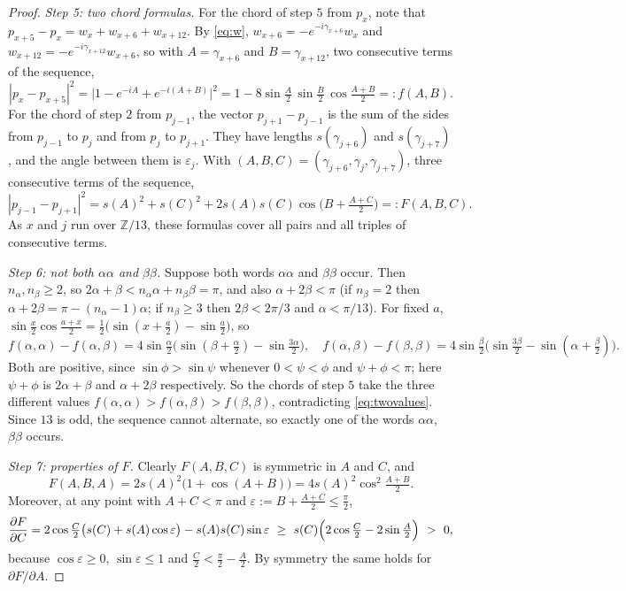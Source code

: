 \documentclass[11pt]{amsart}
\theoremstyle{definition}
\theoremstyle{remark}
\newcommand{\Z}{\mathbb{Z}}
\begin{document}
\begin{proof}
\emph{Step 5: two chord formulas.} For the chord of step $5$ from $p_x$, note that
$p_{x+5}-p_x=w_x+w_{x+6}+w_{x+12}$. By \eqref{eq:w}, $w_{x+6}=-e^{-i\gamma_{x+6}}w_x$ and
$w_{x+12}=-e^{-i\gamma_{x+12}}w_{x+6}$, so with $A=\gamma_{x+6}$ and $B=\gamma_{x+12}$, two consecutive terms
of the sequence,
\[
  |p_x-p_{x+5}|^2=\bigl|1-e^{-iA}+e^{-i(A+B)}\bigr|^2
  =1-8\sin\tfrac A2\,\sin\tfrac B2\,\cos\tfrac{A+B}2=:f(A,B).
\]
For the chord of step $2$ from $p_{j-1}$, the vector $p_{j+1}-p_{j-1}$ is the sum of the
sides from $p_{j-1}$ to $p_j$ and from $p_j$ to $p_{j+1}$. They have lengths $s(\gamma_{j+6})$ and
$s(\gamma_{j+7})$, and the angle between them is $\varepsilon_j$. With $(A,B,C)=(\gamma_{j+6},\gamma_j,\gamma_{j+7})$, three consecutive terms of the
sequence,
\[
  |p_{j-1}-p_{j+1}|^2=s(A)^2+s(C)^2+2s(A)s(C)\cos\bigl(B+\tfrac{A+C}2\bigr)=:F(A,B,C).
\]
As $x$ and $j$ run over $\Z/13$, these formulas cover all pairs and all triples of consecutive terms.

\emph{Step 6: not both $\alpha\alpha$ and $\beta\beta$.} Suppose both words $\alpha\alpha$ and $\beta\beta$
occur. Then $n_\alpha,n_\beta\ge2$, so $2\alpha+\beta<n_\alpha\alpha+n_\beta\beta=\pi$, and also
$\alpha+2\beta<\pi$ (if $n_\beta=2$ then $\alpha+2\beta=\pi-(n_\alpha-1)\alpha$; if $n_\beta\ge3$ then
$2\beta<2\pi/3$ and $\alpha<\pi/13$). For fixed $a$,
$\sin\frac x2\cos\frac{a+x}2=\frac12\bigl(\sin(x+\frac a2)-\sin\frac a2\bigr)$, so
\[
  f(\alpha,\alpha)-f(\alpha,\beta)=4\sin\tfrac\alpha2\bigl(\sin(\beta+\tfrac\alpha2)-\sin\tfrac{3\alpha}2\bigr),\quad
  f(\alpha,\beta)-f(\beta,\beta)=4\sin\tfrac\beta2\bigl(\sin\tfrac{3\beta}2-\sin(\alpha+\tfrac\beta2)\bigr).
\]
Both are positive, since $\sin\phi>\sin\psi$ whenever $0<\psi<\phi$ and $\psi+\phi<\pi$; here
$\psi+\phi$ is $2\alpha+\beta$ and $\alpha+2\beta$ respectively. So the chords of step $5$ take the three different
values $f(\alpha,\alpha)>f(\alpha,\beta)>f(\beta,\beta)$, contradicting \eqref{eq:twovalues}. Since $13$ is
odd, the sequence cannot alternate, so exactly one of the words $\alpha\alpha$, $\beta\beta$ occurs.

\emph{Step 7: properties of $F$.} Clearly $F(A,B,C)$ is symmetric in $A$ and $C$, and
\begin{equation}\label{eq:Fa}
  F(A,B,A)=2s(A)^2\bigl(1+\cos(A+B)\bigr)=4s(A)^2\cos^2\tfrac{A+B}2.
\end{equation}
Moreover, at any point with $A+C<\pi$ and $\varepsilon:=B+\frac{A+C}2\le\frac\pi2$,
\[
  \frac{\partial F}{\partial C}=2\cos\tfrac C2\bigl(s(C)+s(A)\cos\varepsilon\bigr)-s(A)s(C)\sin\varepsilon
  \ \ge\ s(C)\Bigl(2\cos\tfrac C2-2\sin\tfrac A2\Bigr)\ >\ 0,
\]
because $\cos\varepsilon\ge0$, $\sin\varepsilon\le1$ and $\frac C2<\frac\pi2-\frac A2$. By symmetry the same
holds for $\partial F/\partial A$.


\end{proof}
\end{document}
